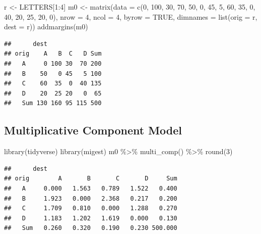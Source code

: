 \documentclass[
]{book}
\newenvironment{Shaded}{\begin{snugshade}}{\end{snugshade}}
\newcommand{\AttributeTok}[1]{\textcolor[rgb]{0.77,0.63,0.00}{#1}}
\newcommand{\ConstantTok}[1]{\textcolor[rgb]{0.00,0.00,0.00}{#1}}
\newcommand{\DecValTok}[1]{\textcolor[rgb]{0.00,0.00,0.81}{#1}}
\newcommand{\FunctionTok}[1]{\textcolor[rgb]{0.00,0.00,0.00}{#1}}
\newcommand{\NormalTok}[1]{#1}
\newcommand{\OtherTok}[1]{\textcolor[rgb]{0.56,0.35,0.01}{#1}}
\newcommand{\SpecialCharTok}[1]{\textcolor[rgb]{0.00,0.00,0.00}{#1}}
\begin{document}
\begin{Shaded}
\begin{Highlighting}[]
\NormalTok{r }\OtherTok{\textless{}{-}}\NormalTok{ LETTERS[}\DecValTok{1}\SpecialCharTok{:}\DecValTok{4}\NormalTok{]}
\NormalTok{m0 }\OtherTok{\textless{}{-}} \FunctionTok{matrix}\NormalTok{(}\AttributeTok{data =} \FunctionTok{c}\NormalTok{(}\DecValTok{0}\NormalTok{, }\DecValTok{100}\NormalTok{, }\DecValTok{30}\NormalTok{, }\DecValTok{70}\NormalTok{, }
                      \DecValTok{50}\NormalTok{, }\DecValTok{0}\NormalTok{, }\DecValTok{45}\NormalTok{, }\DecValTok{5}\NormalTok{, }
                      \DecValTok{60}\NormalTok{, }\DecValTok{35}\NormalTok{, }\DecValTok{0}\NormalTok{, }\DecValTok{40}\NormalTok{, }
                      \DecValTok{20}\NormalTok{, }\DecValTok{25}\NormalTok{, }\DecValTok{20}\NormalTok{, }\DecValTok{0}\NormalTok{), }
             \AttributeTok{nrow =} \DecValTok{4}\NormalTok{, }\AttributeTok{ncol =} \DecValTok{4}\NormalTok{, }\AttributeTok{byrow =} \ConstantTok{TRUE}\NormalTok{, }
             \AttributeTok{dimnames =} \FunctionTok{list}\NormalTok{(}\AttributeTok{orig =}\NormalTok{ r, }\AttributeTok{dest =}\NormalTok{ r))}
\FunctionTok{addmargins}\NormalTok{(m0)}
\end{Highlighting}
\end{Shaded}

\begin{verbatim}
##      dest
## orig    A   B  C   D Sum
##   A     0 100 30  70 200
##   B    50   0 45   5 100
##   C    60  35  0  40 135
##   D    20  25 20   0  65
##   Sum 130 160 95 115 500
\end{verbatim}

\hypertarget{multiplicative-component-model-3}{%
\subsection{Multiplicative Component Model}\label{multiplicative-component-model-3}}

\begin{Shaded}
\begin{Highlighting}[]
\FunctionTok{library}\NormalTok{(tidyverse)}
\FunctionTok{library}\NormalTok{(migest)}
\NormalTok{m0 }\SpecialCharTok{\%\textgreater{}\%}
  \FunctionTok{multi\_comp}\NormalTok{() }\SpecialCharTok{\%\textgreater{}\%}
  \FunctionTok{round}\NormalTok{(}\DecValTok{3}\NormalTok{)}
\end{Highlighting}
\end{Shaded}

\begin{verbatim}
##      dest
## orig        A       B       C       D     Sum
##   A     0.000   1.563   0.789   1.522   0.400
##   B     1.923   0.000   2.368   0.217   0.200
##   C     1.709   0.810   0.000   1.288   0.270
##   D     1.183   1.202   1.619   0.000   0.130
##   Sum   0.260   0.320   0.190   0.230 500.000
\end{verbatim}
\end{document}
